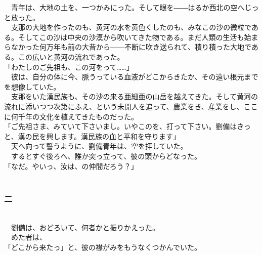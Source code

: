 \documentclass[
  paper=a5,
  fontsize=10pt,
  jafontsize=9.5pt,
  tate,                  %
  open_bracket_pos=nibu, %
]{jlreq}
\begin{document}
　青年は、大地の土を、一つかみにった。そして眼を――はるか西北の空へじっと放った。\\


　支那の大地を作ったのも、黄河の水を黄色くしたのも、みなこの沙の微粒である。そしてこの沙は中央の沙漠から吹いてきた物である。まだ人類の生活も始まらなかった何万年も前の大昔から――不断に吹き送られて、積り積った大地である。この広いと黄河の流れであった。\\


「わたしのご先祖も、この河をって……」\\


　彼は、自分の体に今、脈うっている血液がどこからきたか、その遠い根元までを想像していた。\\


　支那をいた漢民族も、その沙の来る亜細亜の山岳を越えてきた。そして黄河の流れに添いつつ次第にふえ、という未開人を追って、農業をき、産業をし、ここに何千年の文化を植えてきたものだった。\\


「ご先祖さま、みていて下さいまし。いやこのを、打って下さい。劉備はきっと、漢の民を興します。漢民族の血と平和を守ります」\\


　天へ向って誓うように、劉備青年は、空を拝していた。\\


　するとすぐ後ろへ、誰か突っ立って、彼の頭からどなった。\\


「なだ。やいっ、汝は、の仲間だろう？」\\

\\

\subsubsection{二}

\\


　劉備は、おどろいて、何者かと振りかえった。\\


　めた者は、\\


「どこから来たっ」と、彼の襟がみをもうなくつかんでいた。\\
\end{document}
